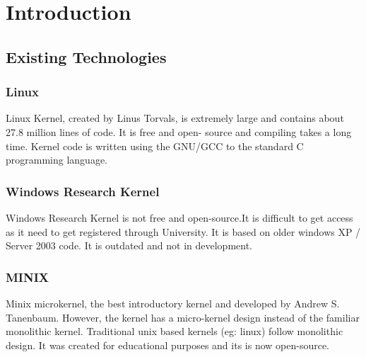 
\chapter{Introduction}\label{chapter:Introduction}


\newpage
\section{Existing Technologies}\label{section:Existing Technologies}
\subsection{Linux}
Linux Kernel, created by Linus Torvals, is extremely large and contains about 27.8 million lines of code. It is free and open- source and compiling takes a long time. Kernel code is written using the GNU/GCC to the standard C programming language. 

\subsection{Windows Research Kernel}
Windows Research Kernel is not free and open-source.It is difficult to get access as it need to get registered through University. It is based on older windows XP / Server 2003 code. It is outdated and not in development.  

\subsection{MINIX}
Minix microkernel, the best introductory kernel and developed by Andrew S. Tanenbaum. However, the kernel has a micro-kernel design instead of the familiar monolithic kernel. Traditional unix based kernels (eg: linux) follow monolithic design. It was created for educational purposes and its is now open-source.

